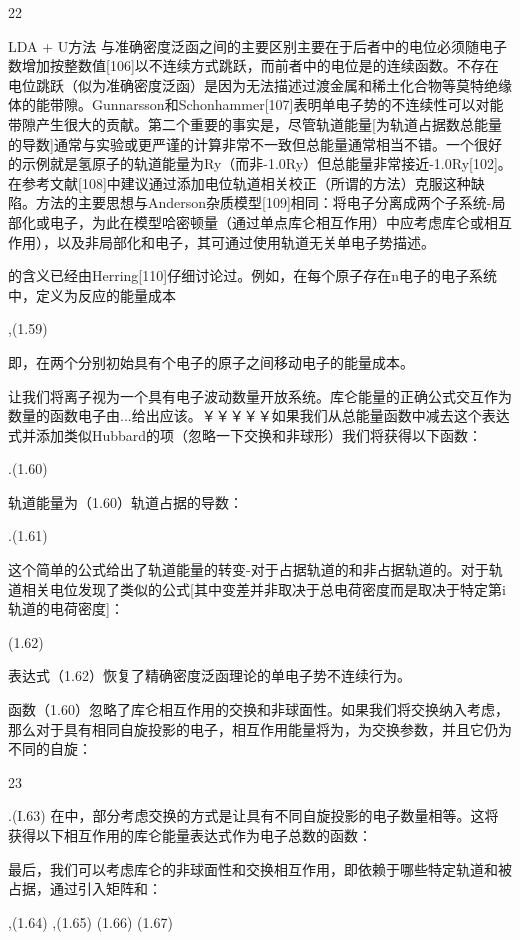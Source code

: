 22


 LDA + U方法  
与准确密度泛函之间的主要区别主要在于后者中的电位必须随电子数增加按整数值[106]以不连续方式跳跃，而前者中的电位是的连续函数。不存在电位跳跃（似为准确密度泛函）是因为无法描述过渡金属和稀土化合物等莫特绝缘体的能带隙。Gunnarsson和Schonhammer[107]表明单电子势的不连续性可以对能带隙产生很大的贡献。第二个重要的事实是，尽管轨道能量[为轨道占据数总能量的导数]通常与实验或更严谨的计算非常不一致但总能量通常相当不错。一个很好的示例就是氢原子的轨道能量为Ry（而非-1.0Ry）但总能量非常接近-1.0Ry[102]。在参考文献[108]中建议通过添加电位轨道相关校正（所谓的方法）克服这种缺陷。方法的主要思想与Anderson杂质模型[109]相同：将电子分离成两个子系统-局部化或电子，为此在模型哈密顿量（通过单点库仑相互作用）中应考虑库仑或相互作用），以及非局部化和电子，其可通过使用轨道无关单电子势描述。

的含义已经由Herring[110]仔细讨论过。例如，在每个原子存在n电子的电子系统中，定义为反应的能量成本

,(1.59)

即，在两个分别初始具有个电子的原子之间移动电子的能量成本。

让我们将离子视为一个具有电子波动数量开放系统。库仑能量的正确公式交互作为数量的函数电子由...给出应该。￥￥￥￥￥如果我们从总能量函数中减去这个表达式并添加类似Hubbard的项（忽略一下交换和非球形）我们将获得以下函数：

.(1.60)

轨道能量为（1.60）轨道占据的导数：


.(1.61)

这个简单的公式给出了轨道能量的转变-对于占据轨道的和非占据轨道的。对于轨道相关电位发现了类似的公式[其中变差并非取决于总电荷密度而是取决于特定第i轨道的电荷密度]：

(1.62)

表达式（1.62）恢复了精确密度泛函理论的单电子势不连续行为。

函数（1.60）忽略了库仑相互作用的交换和非球面性。如果我们将交换纳入考虑，那么对于具有相同自旋投影的电子，相互作用能量将为，为交换参数，并且它仍为不同的自旋：



23



.(I.63)
在中，部分考虑交换的方式是让具有不同自旋投影的电子数量相等。这将获得以下相互作用的库仑能量表达式作为电子总数的函数：



最后，我们可以考虑库仑的非球面性和交换相互作用，即依赖于哪些特定轨道和被占据，通过引入矩阵和：

,(1.64)
,(1.65)
(1.66)
(1.67)

